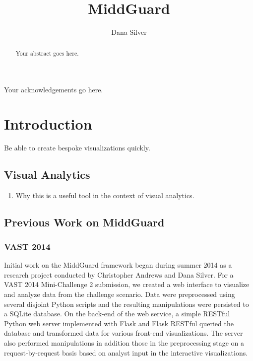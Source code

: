 \documentclass[midd]{thesis}
\title {MiddGuard}
\author {Dana Silver}
\begin{document}
\maketitle

\begin{abstract}
Your abstract goes here.
\end{abstract}

\begin{acknowledgements}
Your acknowledgements go here.
\end{acknowledgements}

\contentspage
\tablelistpage
\figurelistpage

\normalspacing \setcounter{page}{1} 

\chapter{Introduction}

Be able to create bespoke visualizations quickly.

\section{Visual Analytics}
\begin{enumerate}
  \item Why this is a useful tool in the context of visual analytics.
\end{enumerate}

\section{Previous Work on MiddGuard}
\subsection{VAST 2014}

Initial work on the MiddGuard framework began during summer 2014 as a research
project conducted by Christopher Andrews and Dana Silver. For a VAST 2014 Mini-Challenge
2 \cite{vast2014mc2} submission, we created a web interface to
visualize and analyze data from the challenge scenario. Data were preprocessed
using several disjoint Python scripts and the resulting manipulations were
persisted to a SQLite database. On the back-end of the web service, a simple
RESTful Python web server implemented with Flask \cite{flask} and Flask RESTful
\cite{flask-restful} queried the database and transformed data for various
front-end visualizations. The server also performed manipulations in addition
those in the preprocessing stage on a request-by-request basis based on analyst
input in the interactive visualizations.
\end{document}
